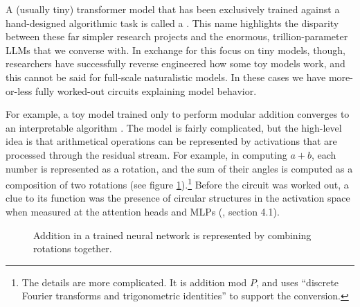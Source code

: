 A (usually tiny) transformer model that has been exclusively trained against a
hand-designed algorithmic task is called a . This name
highlights the disparity between these far simpler research projects and the
enormous, trillion-parameter LLMs that we converse with. In exchange for this
focus on tiny models, though, researchers have successfully reverse engineered
how some toy models work, and this cannot be said for full-scale naturalistic
models. In these cases we have more-or-less fully worked-out circuits
explaining model behavior.

For example, a toy model trained only to perform modular addition converges to
an interpretable algorithm \cite{nanda2023progress}. The model is fairly
complicated, but the high-level idea is that arithmetical operations can be
represented by activations that are processed through the residual stream. For
example, in computing $a + b$, each number is represented as a rotation, and
the sum of their angles is computed as a composition of two rotations (see figure
\ref{toyModelAddition}).\footnote{The details are more complicated. It is
addition mod $P$, and uses ``discrete Fourier transforms and trigonometric
identities'' \cite{nanda2023progress} to support the conversion.} Before the
circuit was worked out, a clue to its function was the presence of circular
structures in the activation space when measured at the attention heads and
MLPs (\cite{nanda2023progress}, section 4.1).

\begin{figure}[ht]
\centering
{}
\caption[From \cite{nanda2023progress}.]{ Addition in a trained neural network
      is represented by combining rotations together. }
\label{toyModelAddition}
\end{figure}


